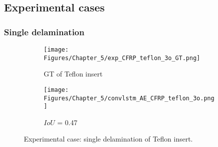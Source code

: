 \subsection{Experimental cases}
\label{sec532}

\subsubsection{Single delamination}
\label{sec5321}

\begin{figure} [!h]
	\centering
	\begin{subfigure}[b]{0.47\textwidth}
		\centering
		\texttt{[image: Figures/Chapter\_5/exp\_CFRP\_teflon\_3o\_GT.png]}
		\caption{GT of Teflon insert}
		\label{fig:exp_CFRP_teflon_3o_GT}
	\end{subfigure}
	\begin{subfigure}[b]{0.47\textwidth}
		\centering
		\texttt{[image: Figures/Chapter\_5/convlstm\_AE\_CFRP\_teflon\_3o.png]}
		\caption{\(IoU\) = 0.47}
		\label{fig:convlstm_AE_CFRP_teflon_3o}
	\end{subfigure}
	\caption{Experimental case: single delamination of Teflon insert.}
	\label{fig:exp_Teflon_insert}
\end{figure} 

